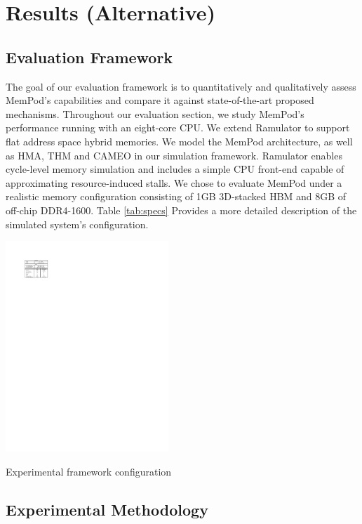 \section{Results (Alternative)}
\label{sec:AltResults}

\subsection{Evaluation Framework}
\label{sub:Evaluation}

The goal of our evaluation framework is to quantitatively and qualitatively assess MemPod's capabilities and compare it against state-of-the-art proposed mechanisms. Throughout our evaluation section, we study MemPod's performance running with an eight-core CPU. We extend Ramulator \cite{kim-ramulator} to support flat address space hybrid memories. We model the MemPod architecture,
as well as HMA, THM and CAMEO in our simulation framework. Ramulator enables 
cycle-level memory simulation and includes a simple CPU front-end capable of approximating resource-induced stalls. We chose to evaluate MemPod under a realistic memory configuration consisting of 1GB 3D-stacked HBM \cite{JEDEC-HBM-REVISED} and 8GB of off-chip DDR4-1600. Table \ref{tab:specs} Provides a more detailed description of the simulated system's configuration.

\begin{table}[t]
  \includegraphics[width=0.46\textwidth]{figures/specs_table.pdf}
  \caption{Experimental framework configuration}
  \label{tab:specs}
\end{table}

\subsection{Experimental Methodology}
\label{sub:Experimental}

